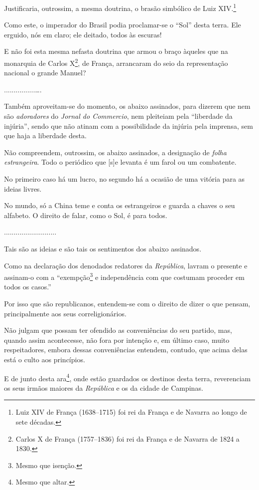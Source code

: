 Justificaria, outrossim, a mesma doutrina, o brasão simbólico de Luiz
XIV.\footnote{ Luiz XIV de França (1638--1715) foi rei da França e de
  Navarra ao longo de sete décadas.}

Como este, o imperador do Brasil podia proclamar-se o ``Sol'' desta terra.
Ele erguido, nós em claro; ele deitado, todos às escuras!

E não foi esta mesma nefasta doutrina que armou o braço àqueles que na
monarquia de Carlos X\footnote{ Carlos X de França (1757--1836) foi rei
  da França e de Navarra de 1824 a 1830.}, de França, arrancaram do seio
da representação nacional o grande Manuel?

................\ldots.

Também aproveitam-se do momento, os abaixo assinados, para dizerem que
nem são \emph{adoradores} do \emph{Jornal do Commercio}, nem pleiteiam
pela ``liberdade da injúria'', sendo que não atinam com a possibilidade da
injúria pela imprensa, sem que haja a liberdade desta.

Não compreendem, outrossim, os abaixo assinados, a designação de
\emph{folha estrangeira}. Todo o periódico que {[}s{]}e levanta é um
farol ou um combatente.

No primeiro caso há um lucro, no segundo há a ocasião de uma vitória
para as ideias livres.

No mundo, só a China teme e conta os estrangeiros e guarda a chaves o
seu alfabeto. O direito de falar, como o Sol, é para todos.

...........................

Tais são as ideias e são tais os sentimentos dos abaixo assinados.

Como na declaração dos denodados redatores da \emph{República}, lavram o
presente e assinam-o com a ``exempção\footnote{ Mesmo que isenção.} e
independência com que costumam proceder em todos os casos.''

Por isso que são republicanos, entendem-se com o direito de dizer o que
pensam, principalmente aos seus correligionários.

Não julgam que possam ter ofendido as conveniências do seu partido, mas,
quando assim acontecesse, não fora por intenção e, em último caso, muito
respeitadores, embora dessas conveniências entendem, contudo, que acima
delas está o culto aos princípios.

E de junto desta ara\footnote{ Mesmo que altar.}, onde estão guardados
os destinos desta terra, reverenciam os seus irmãos maiores da
\emph{República} e os da cidade de Campinas.

